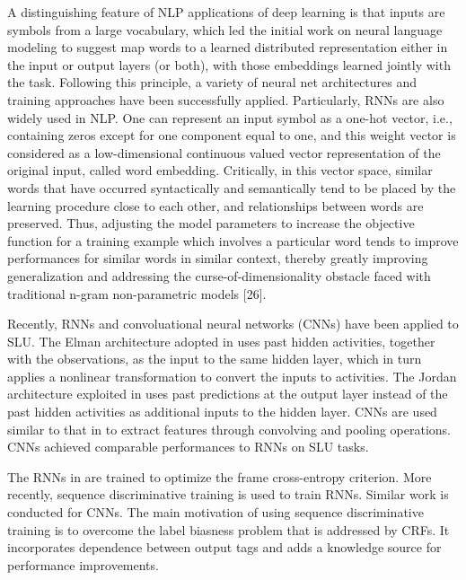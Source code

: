 A distinguishing feature of NLP applications of deep learning
is that inputs are symbols from a large vocabulary, which led
the initial work on neural language modeling to suggest
map words to a learned distributed representation either in the
input or output layers (or both), with those embeddings learned
jointly with the task. Following this principle, a variety of neural
net architectures and training approaches have been successfully
applied. Particularly, RNNs are also widely used in NLP. One can represent an input symbol
as a one-hot vector, i.e., containing zeros except for one component
equal to one, and this weight vector is considered as a
low-dimensional continuous valued vector representation of the
original input, called word embedding. Critically, in this vector
space, similar words that have occurred syntactically and semantically
tend to be placed by the learning procedure close
to each other, and relationships between words are preserved.
Thus, adjusting the model parameters to increase the objective
function for a training example which involves a particular
word tends to improve performances for similar words in
similar context, thereby greatly improving generalization and
addressing the curse-of-dimensionality obstacle faced with traditional
n-gram non-parametric models [26].

Recently, RNNs \cite{multijoint} and convoluational \cite{cnn} neural networks
(CNNs) have been applied to SLU. The Elman \cite{elman1990finding} architecture
adopted in uses past hidden activities, together
with the observations, as the input to the same hidden layer,
which in turn applies a nonlinear transformation to convert
the inputs to activities. The Jordan architecture exploited
in uses past predictions at the output layer instead of the
past hidden activities as additional inputs to the hidden layer.
CNNs are used similar to that in to extract features
through convolving and pooling operations. CNNs achieved
comparable performances to RNNs on SLU tasks.

The RNNs in are trained to optimize the frame
cross-entropy criterion. More recently, sequence discriminative
training is used to train RNNs. Similar work is
conducted for CNNs. The main motivation of using
sequence discriminative training is to overcome the label
biasness problem that is addressed by CRFs. It incorporates
dependence between output tags and adds a knowledge
source for performance improvements.